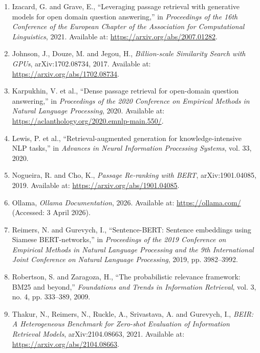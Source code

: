 \begin{enumerate}[leftmargin=*, label=\arabic*., itemsep=0.35\baselineskip]
\item Izacard, G. and Grave, E., ``Leveraging passage retrieval with generative models for open domain question answering,'' in \emph{Proceedings of the 16th Conference of the European Chapter of the Association for Computational Linguistics}, 2021. Available at: \url{https://arxiv.org/abs/2007.01282}.
\item Johnson, J., Douze, M. and Jegou, H., \emph{Billion-scale Similarity Search with GPUs}, arXiv:1702.08734, 2017. Available at: \url{https://arxiv.org/abs/1702.08734}.
\item Karpukhin, V. et al., ``Dense passage retrieval for open-domain question answering,'' in \emph{Proceedings of the 2020 Conference on Empirical Methods in Natural Language Processing}, 2020. Available at: \url{https://aclanthology.org/2020.emnlp-main.550/}.
\item Lewis, P. et al., ``Retrieval-augmented generation for knowledge-intensive NLP tasks,'' in \emph{Advances in Neural Information Processing Systems}, vol. 33, 2020.
\item Nogueira, R. and Cho, K., \emph{Passage Re-ranking with BERT}, arXiv:1901.04085, 2019. Available at: \url{https://arxiv.org/abs/1901.04085}.
\item Ollama, \emph{Ollama Documentation}, 2026. Available at: \url{https://ollama.com/} (Accessed: 3 April 2026).
\item Reimers, N. and Gurevych, I., ``Sentence-BERT: Sentence embeddings using Siamese BERT-networks,'' in \emph{Proceedings of the 2019 Conference on Empirical Methods in Natural Language Processing and the 9th International Joint Conference on Natural Language Processing}, 2019, pp. 3982--3992.
\item Robertson, S. and Zaragoza, H., ``The probabilistic relevance framework: BM25 and beyond,'' \emph{Foundations and Trends in Information Retrieval}, vol. 3, no. 4, pp. 333--389, 2009.
\item Thakur, N., Reimers, N., Ruckle, A., Srivastava, A. and Gurevych, I., \emph{BEIR: A Heterogeneous Benchmark for Zero-shot Evaluation of Information Retrieval Models}, arXiv:2104.08663, 2021. Available at: \url{https://arxiv.org/abs/2104.08663}.
\end{enumerate}
